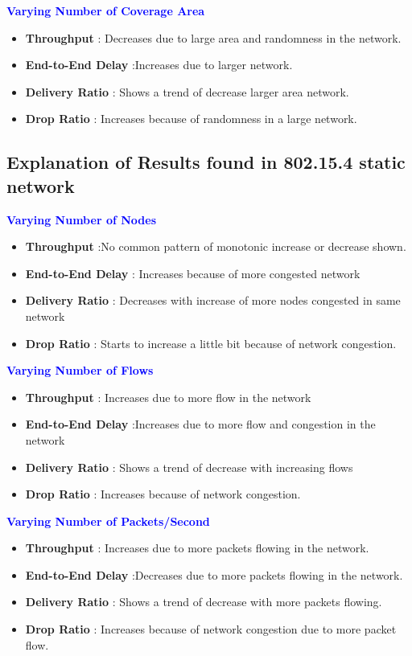 \documentclass{article}[12pt]
\begin{document}
 \textbf{\textcolor{blue}{Varying Number of Coverage Area}}
\begin{itemize}
	\item \textbf{Throughput} : Decreases due to large area and randomness in the network.
	\item \textbf{End-to-End Delay} :Increases due to larger network.
	\item \textbf{Delivery Ratio} : Shows a trend of decrease larger area network.
	\item \textbf{Drop Ratio} : Increases because of randomness in a large network.
\end{itemize}


\newpage


\subsection{Explanation of Results found in 802.15.4 static network}

\textbf{\textcolor{blue}{Varying Number of Nodes}}
\begin{itemize}
	\item \textbf{Throughput} :No common pattern of monotonic increase or decrease shown.
	\item \textbf{End-to-End Delay} : Increases because of more congested network
	\item \textbf{Delivery Ratio} : Decreases with increase of more nodes congested in same network
	\item \textbf{Drop Ratio} : Starts to increase a little bit because of network congestion.
\end{itemize}


\textbf{\textcolor{blue}{Varying Number of Flows}}
\begin{itemize}
	\item \textbf{Throughput} : Increases due to more flow in the network
	\item \textbf{End-to-End Delay} :Increases due to more flow and congestion in the network
	\item \textbf{Delivery Ratio} : Shows a trend of decrease with increasing flows
	\item \textbf{Drop Ratio} : Increases because of network congestion.
\end{itemize}

\textbf{\textcolor{blue}{Varying Number of Packets/Second}}
\begin{itemize}
	\item \textbf{Throughput} : Increases due to more packets flowing in the network.
	\item \textbf{End-to-End Delay} :Decreases due to more packets flowing in the network.
	\item \textbf{Delivery Ratio} : Shows a trend of decrease with more packets flowing. 
	\item \textbf{Drop Ratio} : Increases because of network congestion due to more packet flow.
\end{itemize}
\end{document}
